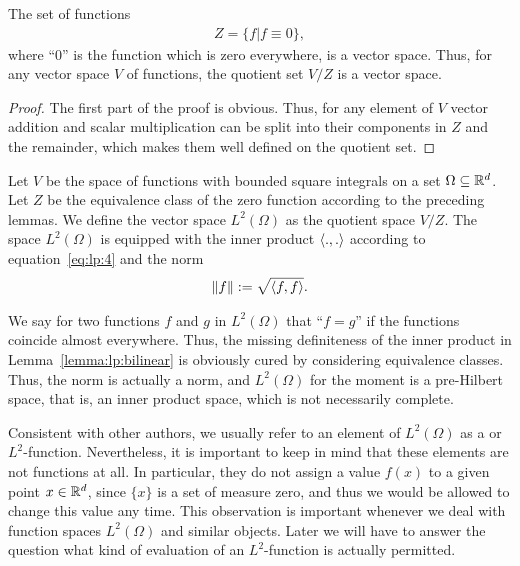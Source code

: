 \begin{lemma}
  The set of functions
  \begin{gather*}
    Z = \bigl\{ f \big| f\equiv 0 \bigr\},
  \end{gather*}
  where ``0'' is the function which is zero everywhere, is a vector
  space. Thus, for any vector space $V$ of functions, the quotient set
  $V/Z$ is a vector space.
\end{lemma}

\begin{proof}
  The first part of the proof is obvious. Thus, for any element of $V$
  vector addition and scalar multiplication can be split into their
  components in $Z$ and the remainder, which makes them well defined
  on the quotient set.
\end{proof}

\begin{definition}

  Let $V$ be the space of functions with bounded square integrals on a
  set $\Omega\subseteq \mathbb R^d$. Let $Z$ be the equivalence class of the
  zero function according to the preceding lemmas. We define the
  vector space $L^2(\Omega)$ as the quotient space $V/Z$. The space
  $L^2(\Omega)$ is equipped with the inner product $\scal(.,.)$
  according to equation~\eqref{eq:lp:4} and the norm
  \begin{gather}
    \norm{f} := \sqrt{\scal(f,f)}.
  \end{gather}
\end{definition}

\begin{note}
  We say for two functions $f$ and $g$ in $L^2(\Omega)$ that ``$f=g$''
  if the functions coincide almost everywhere.
  Thus, the missing definiteness of the inner product in
  Lemma~\ref{lemma:lp:bilinear} is obviously cured by considering
  equivalence classes. Thus, the norm is actually a norm, and
  $L^2(\Omega)$ for the moment is a pre-Hilbert space, that is, an
  inner product space, which is not necessarily complete.
\end{note}

\begin{remark}
  Consistent with other authors, we usually refer to an element of
  $L^2(\Omega)$ as a  or
  $L^2$-function. Nevertheless, it is important to keep in mind that
  these elements are not functions at all. In particular, they do not
  assign a value $f(x)$ to a given point $x\in \mathbb R^d$, since $\{x\}$ is
  a set of measure zero, and thus we would be allowed to change this
  value any time. This observation is important whenever we deal with
  function spaces $L^2(\Omega)$ and similar objects. Later we will
  have to answer the question what kind of evaluation of an
  $L^2$-function is actually permitted.
\end{remark}

